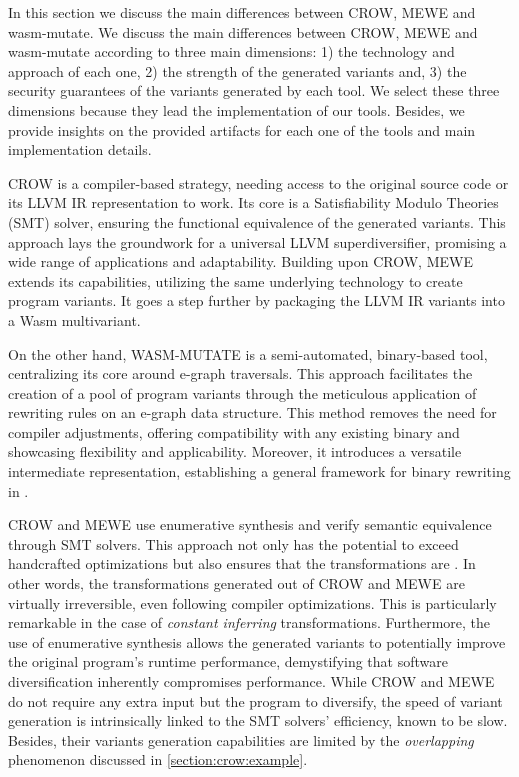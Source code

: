 

In this section we discuss the main differences between CROW, MEWE and wasm-mutate.
We discuss the main differences between CROW, MEWE and wasm-mutate according to three main dimensions: 1) the technology and approach of each one, 2) the strength of the generated variants and, 3) the security guarantees of the variants generated by each tool.
We select these three dimensions because they lead the implementation of our tools.
Besides, we provide insights on the provided artifacts for each one of the tools and main implementation details.

CROW is a compiler-based strategy, needing access to the original source code or its LLVM IR representation to work. 
Its core is a Satisfiability Modulo Theories (SMT) solver, ensuring the functional equivalence of the generated variants.
This approach lays the groundwork for a universal LLVM superdiversifier, promising a wide range of applications and adaptability.
Building upon CROW, MEWE extends its capabilities, utilizing the same underlying technology to create program variants. 
It goes a step further by packaging the LLVM IR variants into a Wasm multivariant.

On the other hand, WASM-MUTATE is a semi-automated, binary-based tool, centralizing its core around e-graph traversals. 
This approach facilitates the creation of a pool of \Wasm program variants through the meticulous application of rewriting rules on an e-graph data structure. 
This method removes the need for compiler adjustments, offering compatibility with any existing \Wasm binary and showcasing flexibility and applicability. 
Moreover, it introduces a versatile intermediate representation, establishing a general framework for binary rewriting in \Wasm.

CROW and MEWE use enumerative synthesis and verify semantic equivalence through SMT solvers. 
This approach not only has the potential to exceed handcrafted optimizations but also ensures that the transformations are . 
In other words, the transformations generated out of CROW and MEWE are virtually irreversible, even following compiler optimizations. 
This is particularly remarkable in the case of \emph{constant inferring} transformations. 
Furthermore, the use of enumerative synthesis allows the generated variants to potentially improve the original program's runtime performance, demystifying that software diversification inherently compromises performance. 
While CROW and MEWE do not require any extra input but the program to diversify, the speed of variant generation is intrinsically linked to the SMT solvers' efficiency, known to be slow. 
Besides, their variants generation capabilities are limited by the \emph{overlapping} phenomenon discussed in \autoref{section:crow:example}.

